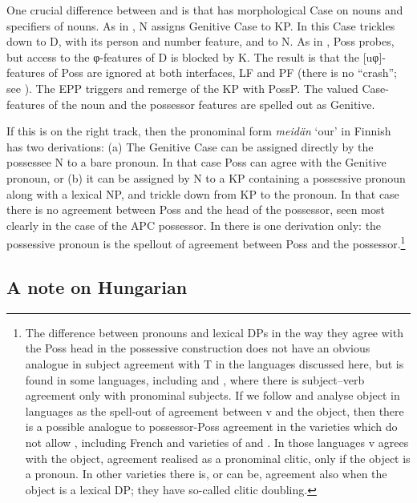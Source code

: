 \documentclass[output=paper]{langsci/langscibook}
\begin{document}
One crucial difference between  and  is that  has
morphological Case on nouns and specifiers of nouns. As in , N assigns
Genitive Case to KP. In  this Case trickles down to D, with its person
and number feature, and to N. As in , Poss probes, but access to the
φ-features of D is blocked by K. The result is that the [uφ]-features of Poss
are ignored at both interfaces, LF and PF (there is no \enquote{crash}; see
\citealt{Preminger2014}). The \gls{EPP}
triggers  and remerge of the KP with PossP. The valued Case-features of
the noun and the possessor features are spelled out as Genitive.\largerpage[-2]

If this is on the right track, then the pronominal form \emph{meidän} `our' in
Finnish has two derivations: (a) The Genitive Case can be assigned directly by
the possessee N to a bare pronoun. In that case Poss can agree with the
Genitive pronoun, or (b) it can be assigned by N to a KP containing a
possessive pronoun along with a lexical NP, and trickle down from KP to the
pronoun. In that case there is no agreement between Poss and the head of the
possessor, seen most clearly in the case of the \gls{APC} possessor. In 
there is one derivation only: the possessive pronoun is the spellout of
agreement between Poss and the possessor.\footnote{The difference between
pronouns and lexical DPs in the way they agree with the Poss head in the
possessive construction does not have an obvious analogue in subject
agreement
with T in the languages discussed here, but is found in some languages,
including  and , where there is subject--verb
agreement only with
pronominal subjects. If we follow \citet[128--139]{Roberts2010} and analyse
object  in  languages as the spell-out of agreement between v and
the object, then there is a possible analogue to possessor-Poss agreement in
the  varieties which do not allow , including French and
varieties of  and . In those languages v agrees with the object,
agreement realised as a pronominal clitic, only if the object is a pronoun. In
other varieties there is, or can be, agreement also when the object is a
lexical DP; they have so-called clitic doubling.}

\subsection{A note on Hungarian}\label{sec:key:16.3.4}
\end{document}
